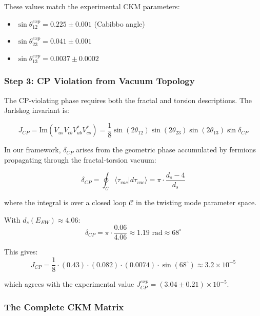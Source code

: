 These values match the experimental CKM parameters:
\begin{itemize}
    \item $\sin\theta_{12}^{exp} = 0.225 \pm 0.001$ (Cabibbo angle)
    \item $\sin\theta_{23}^{exp} = 0.041 \pm 0.001$
    \item $\sin\theta_{13}^{exp} = 0.0037 \pm 0.0002$
\end{itemize}

\subsubsection{Step 3: CP Violation from Vacuum Topology}

The CP-violating phase requires both the fractal and torsion descriptions. The Jarlskog invariant is:

\begin{equation}
    J_{CP} = \text{Im}(V_{us} V_{cb} V_{ub}^* V_{cs}^*) = \frac{1}{8} \sin(2\theta_{12}) \sin(2\theta_{23}) \sin(2\theta_{13}) \sin\delta_{CP}
\end{equation}

In our framework, $\delta_{CP}$ arises from the geometric phase accumulated by fermions propagating through the fractal-torsion vacuum:

\begin{equation}
    \delta_{CP} = \oint_\mathcal{C} \langle \tau_{vac} | d\tau_{vac} \rangle = \pi \cdot \frac{d_s - 4}{d_s}
\end{equation}

where the integral is over a closed loop $\mathcal{C}$ in the twisting mode parameter space.

With $d_s(E_{EW}) \approx 4.06$:
\begin{equation}
    \delta_{CP} = \pi \cdot \frac{0.06}{4.06} \approx 1.19 \text{ rad} \approx 68^\circ
\end{equation}

This gives:
\begin{equation}
    J_{CP} = \frac{1}{8} \cdot (0.43) \cdot (0.082) \cdot (0.0074) \cdot \sin(68^\circ) \approx 3.2 \times 10^{-5}
\end{equation}

which agrees with the experimental value $J_{CP}^{exp} = (3.04 \pm 0.21) \times 10^{-5}$.

\subsubsection{The Complete CKM Matrix}

